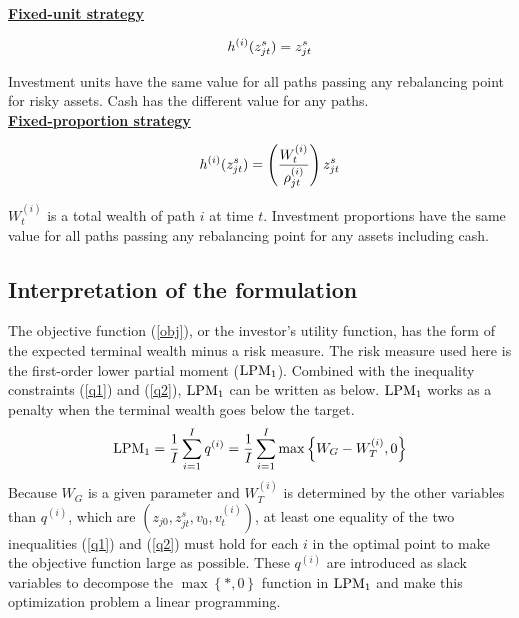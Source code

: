 \documentclass[11t]{article}
\begin{document}
{\bf \underline{Fixed-unit strategy}}
\begin{fleqn}
\begin{gather}
\hspace{5mm} h^{(i)} ( z^{s}_{jt} ) = z^{s}_{jt}   \label{fix_unit}
\end{gather}
\end{fleqn}
Investment units have the same value for all paths passing any rebalancing point for risky assets. Cash has the different value for any paths. \vspace{3mm} \\
{\bf \underline{Fixed-proportion strategy}}
\begin{fleqn}
\begin{gather}
\hspace{5mm} h^{(i)} ( z^{s}_{jt} ) = \left( \frac{ W_t^{(i)}}{ \rho_{jt}^{(i)} } \right) z^{s}_{jt}   \label{fix_prop}
\end{gather}
\end{fleqn}
$W_t^{(i)}$ is a total wealth of path $i$ at time $t$. Investment proportions have the same value for all paths passing any rebalancing point for any assets including cash.


\subsection{Interpretation of the formulation}
The objective function (\ref{obj}), or the investor's utility function, has the form of the expected terminal wealth minus a risk measure. The risk measure used here is the first-order lower partial moment (${\rm LPM}_1$). 
Combined with the inequality constraints (\ref{q1}) and (\ref{q2}), ${\rm LPM}_1$ can be written as below. ${\rm LPM}_1$ works as a penalty when the terminal wealth goes below the target.
\begin{equation*}
{\rm LPM}_1 =  \frac{1}{I} \sum_{i=1}^{I} q^{(i)}  =  \frac{1}{I} \sum_{i=1}^{I} \max \left\{ W_G - W_T^{(i)}, 0 \right\}
\end{equation*}
Because $W_G$ is a given parameter and $W_T^{(i)}$ is determined by the other variables than $q^{(i)}$, which are $ \left( z_{j0},  z^s_{jt}, v_{0}, v_t^{(i)} \right)$, at least one equality of the two inequalities (\ref{q1}) and (\ref{q2}) must hold for each $i$ in the optimal point to make the objective function large as possible.
These $q^{(i)}$ are introduced as slack variables to decompose the $\max \left\{*, 0 \right\}$ function in ${\rm LPM}_1$ and make this optimization problem a linear programming.
\end{document}
